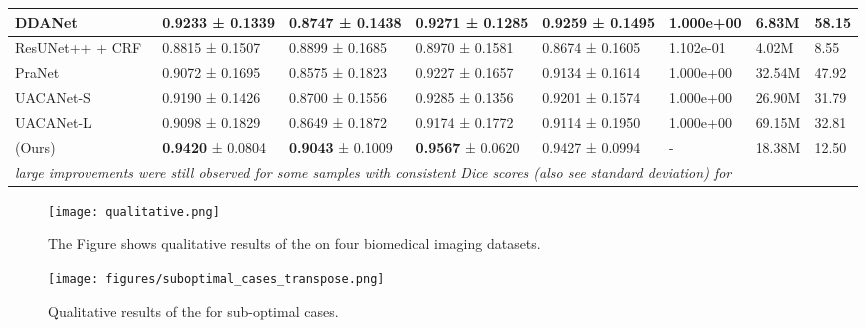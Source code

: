 \documentclass[journal,twoside,web]{IEEEtran}
\newcommand{\sysname}{\text{MSRF-Net}\xspace}
\begin{document}
\begin{table*}[!t]
\begin{tabular}{@{}l|l|l|l|l|l|l|l@{}}
DDANet~\cite{tomar2020ddanet} & 0.9233 ± 0.1339 & 0.8747 ± 0.1438 & 0.9271 ± 0.1285 & 0.9259 ± 0.1495 & 1.000e+00 & 6.83M & 58.15 \\ \hline
ResUNet++ + CRF~\cite{jha2021comprehensive}&0.8815 ± 0.1507 &0.8899 ± 0.1685 &0.8970 ± 0.1581  &0.8674 ± 0.1605 & 1.102e-01 & 4.02M & 8.55 \\ \hline

PraNet~\cite{fan2020pranet}  & 0.9072 ± 0.1695 & 0.8575 ± 0.1823 & 0.9227 ± 0.1657 & 0.9134 ± 0.1614 & 1.000e+00 & 32.54M & 47.92 \\ \hline

UACANet-S~\cite{kim2021uacanet} & 0.9190 ± 0.1426 & 0.8700 ± 0.1556 & 0.9285 ± 0.1356 & 0.9201 ± 0.1574 & 1.000e+00 & 26.90M & 31.79 \\ \hline

UACANet-L~\cite{kim2021uacanet}& 0.9098 ± 0.1829 & 0.8649 ± 0.1872 & 0.9174 ± 0.1772 & 0.9114 ± 0.1950 & 1.000e+00 & 69.15M & 32.81 \\ \hline

\sysname (Ours) & \textbf{0.9420} ± 0.0804 & \textbf{0.9043} ± 0.1009 & \textbf{0.9567} ± 0.0620 & 0.9427 ± 0.0994 & - & 18.38M & 12.50  \\
\hline
\bottomrule
 \multicolumn{7}{l}{ \textit{large improvements were still observed for some samples with consistent Dice scores (also see standard deviation) for \sysname} \hspace{.1cm}}
\end{tabular}
\vspace{-1mm}
\end{table*}


\begin{figure*}[t!]
\centering
\texttt{[image: qualitative.png]}
\caption{The Figure shows qualitative results of the \sysname on four biomedical imaging datasets.
    \label{fig:qualitativeresults}}
\vspace{-2mm}
\end{figure*}


\begin{figure}[t!]
    \begin{center}
    
    \texttt{[image: figures/suboptimal\_cases\_transpose.png]}
    \caption{Qualitative results of the \sysname for sub-optimal cases.}
    \label{fig:suboptimal}
    \end{center}
    \vspace{-5mm}
\end{figure}
\end{document}
